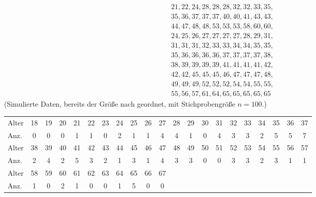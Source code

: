 \begin{bsp}
    \[
        \begin{array}{l}
            21, 22, 24, 28, 28, 28, 32, 32, 33, 35,\\
            35, 36, 37, 37, 37, 40, 40, 41, 43, 43,\\
            44, 47, 48, 48, 53, 53, 53, 58, 60, 60,\\
            24, 25, 26, 27, 27, 27, 27, 28, 29, 31,\\
            31, 31, 31, 32, 33, 33, 34, 34, 35, 35,\\
            35, 36, 36, 36, 36, 37, 37, 37, 37, 38,\\
            38, 39, 39, 39, 39, 41, 41, 41, 41, 42,\\
            42, 42, 45, 45, 45, 46, 47, 47, 47, 48,\\
            49, 49, 49, 52, 52, 52, 54, 54, 55, 55,\\
            55, 56, 57, 61, 64, 65, 65, 65, 65, 65
        \end{array}
    \]
    (Simulierte Daten, bereits der Größe nach geordnet, mit Stichprobengröße $n=100$.)

    \begin{mytable}
        \small
        \begin{tabular}{l*{20}{c}}
            \hline
            Alter & 18 & 19 & 20 & 21 & 22 & 23 & 24 & 25 & 26 & 27 & 28 & 29 & 30 & 31 & 32 & 33 & 34 & 35 & 36 & 37 \\
            Anz.
            & 0  & 0  & 0  & 1  & 1  & 0  & 2  & 1  & 1  & 4  & 4  & 1  & 0  & 4  & 3  & 3  & 2  & 5  & 5  & 7  \\
            \hline
            Alter & 38 & 39 & 40 & 41 & 42 & 43 & 44 & 45 & 46 & 47 & 48 & 49 & 50 & 51 & 52 & 53 & 54 & 55 & 56 & 57 \\
            Anz.
            & 2  & 4  & 2  & 5  & 3  & 2  & 1  & 3  & 1  & 4  & 3  & 3  & 0  & 0  & 3  & 3  & 2  & 3  & 1  & 1  \\
            \hline
            Alter & 58 & 59 & 60 & 61 & 62 & 63 & 64 & 65 & 66 & 67 &    &    &    &    &    &    &    &    &    &    \\
            Anz.
            & 1  & 0  & 2  & 1  & 0  & 0  & 1  & 5  & 0  & 0  &    &    &    &    &    &    &    &    &    &    \\
            \hline
        \end{tabular}
    \end{mytable}


\end{bsp}
